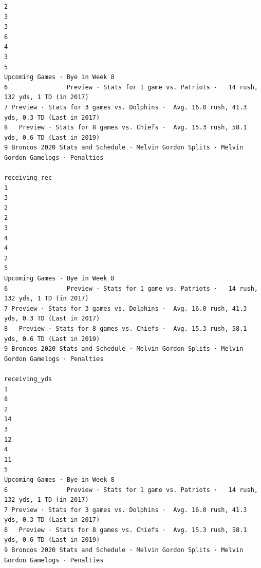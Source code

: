 \documentclass[
]{article}
\begin{document}
\begin{verbatim}
2                                                                                           3
3                                                                                           6
4                                                                                           3
5                                                              Upcoming Games · Bye in Week 8
6                Preview · Stats for 1 game vs. Patriots ·   14 rush, 132 yds, 1 TD (in 2017)
7 Preview · Stats for 3 games vs. Dolphins ·  Avg. 16.0 rush, 41.3 yds, 0.3 TD (Last in 2017)
8   Preview · Stats for 8 games vs. Chiefs ·  Avg. 15.3 rush, 58.1 yds, 0.6 TD (Last in 2019)
9 Broncos 2020 Stats and Schedule · Melvin Gordon Splits · Melvin Gordon Gamelogs · Penalties
                                                                                receiving_rec
1                                                                                           3
2                                                                                           2
3                                                                                           4
4                                                                                           2
5                                                              Upcoming Games · Bye in Week 8
6                Preview · Stats for 1 game vs. Patriots ·   14 rush, 132 yds, 1 TD (in 2017)
7 Preview · Stats for 3 games vs. Dolphins ·  Avg. 16.0 rush, 41.3 yds, 0.3 TD (Last in 2017)
8   Preview · Stats for 8 games vs. Chiefs ·  Avg. 15.3 rush, 58.1 yds, 0.6 TD (Last in 2019)
9 Broncos 2020 Stats and Schedule · Melvin Gordon Splits · Melvin Gordon Gamelogs · Penalties
                                                                                receiving_yds
1                                                                                           8
2                                                                                          14
3                                                                                          12
4                                                                                          11
5                                                              Upcoming Games · Bye in Week 8
6                Preview · Stats for 1 game vs. Patriots ·   14 rush, 132 yds, 1 TD (in 2017)
7 Preview · Stats for 3 games vs. Dolphins ·  Avg. 16.0 rush, 41.3 yds, 0.3 TD (Last in 2017)
8   Preview · Stats for 8 games vs. Chiefs ·  Avg. 15.3 rush, 58.1 yds, 0.6 TD (Last in 2019)
9 Broncos 2020 Stats and Schedule · Melvin Gordon Splits · Melvin Gordon Gamelogs · Penalties

\end{verbatim}
\end{document}
